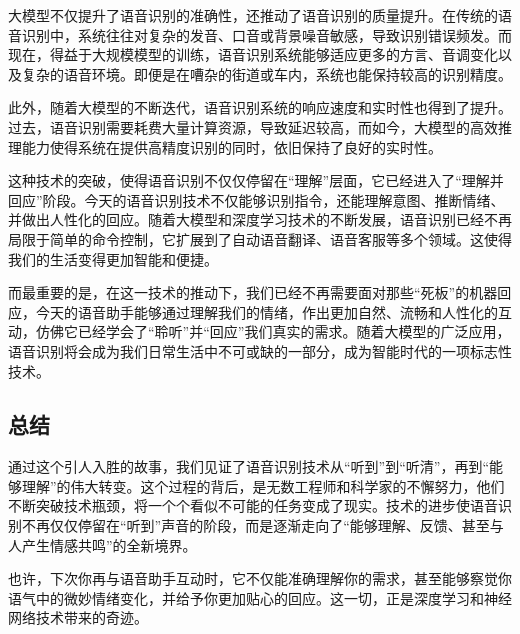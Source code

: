 大模型不仅提升了语音识别的准确性，还推动了语音识别的质量提升。在传统的语音识别中，系统往往对复杂的发音、口音或背景噪音敏感，导致识别错误频发。而现在，得益于大规模模型的训练，语音识别系统能够适应更多的方言、音调变化以及复杂的语音环境。即便是在嘈杂的街道或车内，系统也能保持较高的识别精度。

此外，随着大模型的不断迭代，语音识别系统的响应速度和实时性也得到了提升。过去，语音识别需要耗费大量计算资源，导致延迟较高，而如今，大模型的高效推理能力使得系统在提供高精度识别的同时，依旧保持了良好的实时性。

这种技术的突破，使得语音识别不仅仅停留在“理解”层面，它已经进入了“理解并回应”阶段。今天的语音识别技术不仅能够识别指令，还能理解意图、推断情绪、并做出人性化的回应。随着大模型和深度学习技术的不断发展，语音识别已经不再局限于简单的命令控制，它扩展到了自动语音翻译、语音客服等多个领域。这使得我们的生活变得更加智能和便捷。

而最重要的是，在这一技术的推动下，我们已经不再需要面对那些“死板”的机器回应，今天的语音助手能够通过理解我们的情绪，作出更加自然、流畅和人性化的互动，仿佛它已经学会了“聆听”并“回应”我们真实的需求。随着大模型的广泛应用，语音识别将会成为我们日常生活中不可或缺的一部分，成为智能时代的一项标志性技术。

\subsection{总结}
通过这个引人入胜的故事，我们见证了语音识别技术从“听到”到“听清”，再到“能够理解”的伟大转变。这个过程的背后，是无数工程师和科学家的不懈努力，他们不断突破技术瓶颈，将一个个看似不可能的任务变成了现实。技术的进步使语音识别不再仅仅停留在“听到”声音的阶段，而是逐渐走向了“能够理解、反馈、甚至与人产生情感共鸣”的全新境界。

也许，下次你再与语音助手互动时，它不仅能准确理解你的需求，甚至能够察觉你语气中的微妙情绪变化，并给予你更加贴心的回应。这一切，正是深度学习和神经网络技术带来的奇迹。






